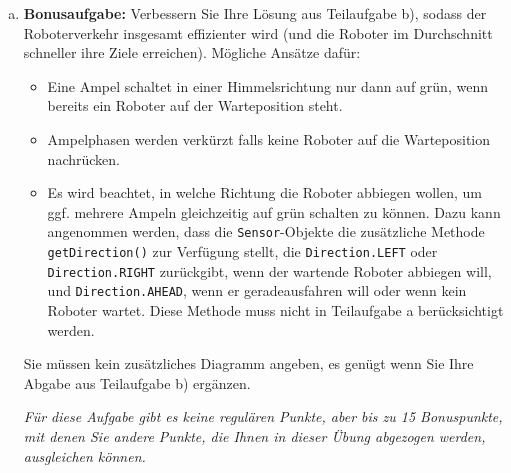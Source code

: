 \begin{enumerate}[a) ,resume]
	\item \textbf{Bonusaufgabe:} Verbessern Sie Ihre Lösung aus Teilaufgabe b), sodass der Roboterverkehr insgesamt effizienter wird (und die Roboter im Durchschnitt schneller ihre Ziele erreichen). Mögliche Ansätze dafür:
	\begin{itemize}
		\item Eine Ampel schaltet in einer Himmelsrichtung nur dann auf grün, wenn bereits ein Roboter auf der Warteposition steht.
		\item Ampelphasen werden verkürzt falls keine Roboter auf die Warteposition nachrücken.
		\item Es wird beachtet, in welche Richtung die Roboter abbiegen wollen, um ggf. mehrere Ampeln gleichzeitig auf grün schalten zu können.
		Dazu kann angenommen werden, dass die  \texttt{Sensor}-Objekte die zusätzliche Methode \texttt{getDirection()} zur Verfügung stellt, die \texttt{Direction.LEFT} oder \texttt{Direction.RIGHT} zurückgibt, wenn der wartende Roboter abbiegen will, und \texttt{Direction.AHEAD}, wenn er geradeausfahren will oder wenn kein Roboter wartet. Diese Methode muss nicht in Teilaufgabe a berücksichtigt werden.
	\end{itemize}
	Sie müssen kein zusätzliches Diagramm angeben, es genügt wenn Sie Ihre Abgabe aus Teilaufgabe b) ergänzen. 

	\textit{Für diese Aufgabe gibt es keine regulären Punkte, aber bis zu 15 Bonuspunkte, mit denen Sie andere Punkte, die Ihnen in dieser Übung abgezogen werden, ausgleichen können.}
\end{enumerate}




\solution{\newpage}